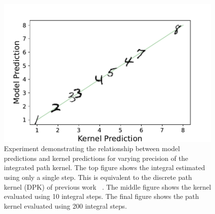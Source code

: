 \begin{figure}[!h]
    \includegraphics[width=0.95\linewidth]{c4_figures/mnist_model_kernel_compare_200_steps.pdf}
    \caption{Experiment demonstrating the relationship between model predictions and kernel predictions for varying precision of the integrated path kernel. The top figure shows the integral estimated using only a single step. This is equivalent to the discrete path kernel (DPK) of previous work ~\cite{domingos2020every, chen2021equivalence}. The middle figure shows the kernel evaluated using 10 integral steps. The final figure shows the path kernel evaluated using 200 integral steps.}
    \label{fig:mnist}
\end{figure}

